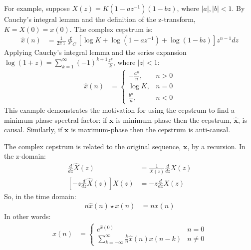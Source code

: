 \documentclass[a4paper,twoside,10pt,english]{report}
\begin{document}
For example, suppose $X\left(z\right)=K\left(1-az^{-1}\right)\left(1-bz\right)$,
where $\left|a\right|,\left|b\right|<1$. By Cauchy's integral lemma and the
definition of the z-transform, $K=X\left(0\right)=x\left(0\right)$. The complex
cepstrum is:
\begin{align*}
\hat{x}\left(n\right)&=
\frac{1}{2\pi\imath}\ointctrclockwise_{C}\left[\log K +
\log\left(1-az^{-1}\right)+ \log\left(1-bz\right)\right]z^{n-1}dz
\end{align*}
Applying Cauchy's integral lemma and the series expansion
$\log\left(1+z\right)=\sum_{k=1}^{\infty}\left(-1\right)^{k+1}\frac{z^{k}}{k}$,
where $\left|z\right|<1$:
\begin{align*}
\hat{x}\left(n\right) &= \begin{cases}
  -\frac{a^{n}}{n} , & n>0 \\
  \log K , & n=0 \\
  \frac{b^{n}}{n} , & n<0
\end{cases}
\end{align*}
This example demonstrates the motivation for using the cepstrum to find a
minimum-phase spectral factor: if $\boldsymbol{x}$ is minimum-phase then
the cepstrum, $\boldsymbol{\hat{x}}$, is causal. Similarly, if $\boldsymbol{x}$
is maximum-phase then the cepstrum is anti-causal.

The complex cepstrum is related to the original sequence, $\boldsymbol{x}$, by
a recursion. In the z-domain:
\begin{align*}
  \frac{d}{dz}\hat{X}\left(z\right)&=
  \frac{1}{X\left(z\right)}\frac{d}{dz}X\left(z\right)\\
  \left[-z\frac{d}{dz}\hat{X}\left(z\right)\right] X\left(z\right) &=
  -z\frac{d}{dz}X\left(z\right)
\end{align*}
So, in the time domain:
\begin{align*}
  n\hat{x}\left(n\right) \star x\left(n\right) &= nx\left(n\right)
\end{align*}
In other words:
\begin{align}
x\left(n\right) &= \begin{cases}
e^{ \hat{x}\left(0\right)}  & n=0\\
\sum_{k=-\infty}^{\infty}\frac{k}{n}\hat{x}\left(n\right)x\left(n-k\right) & n\neq 0
\end{cases}\label{eqn:Cepstral-recursion}
\end{align}
\end{document}
